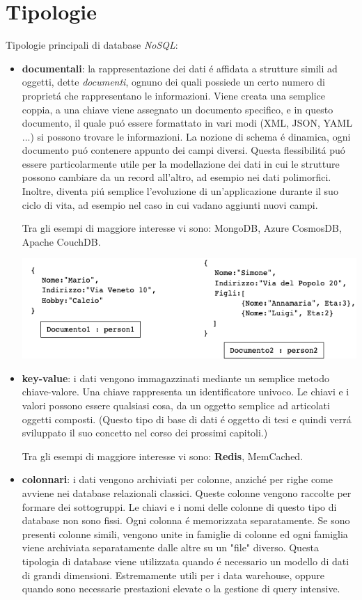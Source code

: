 \section{Tipologie}
Tipologie principali di database \emph{NoSQL}:
\begin{itemize}
    \item \textbf{documentali}: la rappresentazione dei dati é affidata a strutture simili ad oggetti, dette \emph{documenti}, ognuno dei
    quali possiede un certo numero di proprietá che rappresentano le informazioni.
    Viene creata una semplice coppia, a una chiave viene assegnato un documento specifico, e in questo documento, il quale puó essere
    formattato in vari modi (XML, JSON, YAML ...) si possono trovare le informazioni.
    La nozione di schema é dinamica, ogni documento puó contenere appunto dei campi diversi. Questa flessibilitá puó essere particolarmente
    utile per la modellazione dei dati in cui le strutture possono cambiare da un record all'altro, ad esempio nei dati polimorfici.
    Inoltre, diventa piú semplice l'evoluzione di un'applicazione durante il suo ciclo di vita, ad esempio nel caso in cui vadano aggiunti nuovi
    campi.

    Tra gli esempi di maggiore interesse vi sono: MongoDB, Azure CosmosDB, Apache CouchDB.

    \includegraphics[width=1\textwidth]{img/dbDocumentale}

    \item \textbf{key-value}: i dati vengono immagazzinati mediante un semplice metodo chiave-valore. Una chiave rappresenta un identificatore
    univoco. Le chiavi e i valori possono essere qualsiasi cosa, da un oggetto semplice ad articolati oggetti composti.
    (Questo tipo di base di dati é oggetto di tesi e quindi verrá sviluppato il suo concetto nel corso dei prossimi capitoli.)

    Tra gli esempi di maggiore interesse vi sono: \textbf{Redis}, MemCached.
    \item \textbf{colonnari}: i dati vengono archiviati per colonne, anziché per righe come avviene nei database relazionali classici.
    Queste colonne vengono raccolte per formare dei sottogruppi. Le chiavi e i nomi delle colonne di questo tipo di database non sono fissi.
    Ogni colonna é memorizzata separatamente. Se sono presenti colonne simili, vengono unite in famiglie di colonne ed ogni famiglia
    viene archiviata separatamente dalle altre su un "file" diverso.
    Questa tipologia di database viene utilizzata quando é necessario un modello di dati di grandi dimensioni. Estremamente utili
    per i data warehouse, oppure quando sono necessarie prestazioni elevate o la gestione di query intensive.


\end{itemize}
